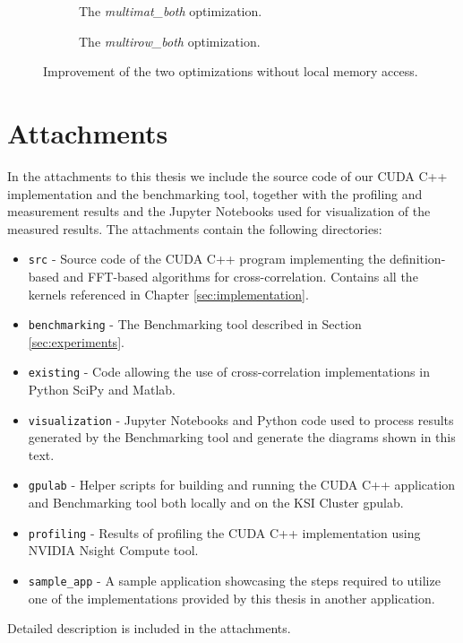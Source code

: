 \begin{figure}[ht]
	\centering	
	\begin{subfigure}{0.45\textwidth}
		\centering
		\def\svgwidth{\textwidth}
		
		\caption{The \textit{multimat\_both} optimization.}
		\label{fig:multimat_both_speedup}
	\end{subfigure}
	\hfill
	\begin{subfigure}{0.45\textwidth}
		\centering
		\def\svgwidth{\textwidth}
		
		\caption{The \textit{multirow\_both} optimization.}
		\label{fig:multirow_both_speedup}
	\end{subfigure}
	
	\caption{Improvement of the two optimizations without local memory access.}
	\label{fig:speedup_local_mem}
\end{figure}




\chapter{Attachments}

In the attachments to this thesis we include the source code of our CUDA C++ implementation and the benchmarking tool, together with the profiling and measurement results and the Jupyter Notebooks used for visualization of the measured results. The attachments contain the following directories:

\begin{itemize}
	\item \texttt{src} - Source code of the CUDA C++ program implementing the definition-based and FFT-based algorithms for cross-correlation. Contains all the kernels referenced in Chapter \ref{sec:implementation}.
	\item \texttt{benchmarking} - The Benchmarking tool described in Section \ref{sec:experiments}.
	\item \texttt{existing} - Code allowing the use of cross-correlation implementations in Python SciPy and Matlab.
	\item \texttt{visualization} - Jupyter Notebooks and Python code used to process results generated by the Benchmarking tool and generate the diagrams shown in this text.
	\item \texttt{gpulab} - Helper scripts for building and running the CUDA C++ application and Benchmarking tool both locally and on the KSI Cluster gpulab.
	\item \texttt{profiling} - Results of profiling the CUDA C++ implementation using NVIDIA Nsight Compute tool.
	\item \texttt{sample\_app} - A sample application showcasing the steps required to utilize one of the implementations provided by this thesis in another application.
\end{itemize}

Detailed description is included in the attachments.